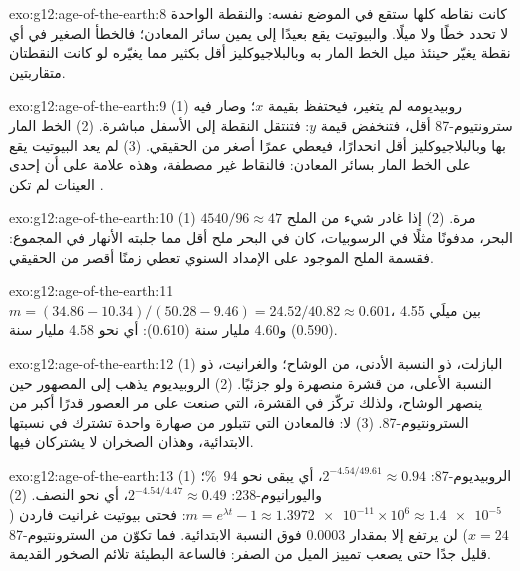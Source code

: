 \begin{solution}{exo:g12:age-of-the-earth:8}
كانت نقاطه كلها ستقع في الموضع نفسه: والنقطة الواحدة لا تحدد خطًا ولا
ميلًا. والبيوتيت يقع بعيدًا إلى يمين سائر المعادن؛ فالخطأ الصغير في
أي نقطة يغيّر حينئذ ميل الخط المار به وبالبلاجيوكليز
أقل بكثير مما يغيّره لو كانت النقطتان متقاربتين.
\end{solution}

\begin{solution}{exo:g12:age-of-the-earth:9}
(1) روبيديومه لم يتغير، فيحتفظ بقيمة $x$؛ وصار فيه
سترونتيوم-87 أقل، فتنخفض قيمة $y$: فتنتقل النقطة إلى الأسفل مباشرة. (2) الخط
المار بها وبالبلاجيوكليز أقل انحدارًا، فيعطي عمرًا أصغر من الحقيقي.
(3) لم يعد البيوتيت يقع على الخط المار بسائر المعادن: فالنقاط
غير مصطفة، وهذه علامة على أن إحدى العينات لم تكن .
\end{solution}

\begin{solution}{exo:g12:age-of-the-earth:10}
(1) $4540/96 \approx 47$ مرة. (2) إذا غادر شيء من الملح البحر، مدفونًا
مثلًا في الرسوبيات، كان في البحر ملح أقل مما جلبته الأنهار في المجموع:
فقسمة الملح الموجود على الإمداد السنوي تعطي زمنًا أقصر من
الحقيقي.
\end{solution}

\begin{solution}{exo:g12:age-of-the-earth:11}
$m = (34.86 - 10.34)/(50.28 - 9.46) = 24.52/40.82 \approx 0.601$، بين
ميلَي 4.55 (0.590) و4.60 مليار سنة (0.610): أي نحو 4.58
مليار سنة.
\end{solution}

\begin{solution}{exo:g12:age-of-the-earth:12}
(1) البازلت، ذو النسبة الأدنى، من الوشاح؛ والغرانيت، ذو النسبة
الأعلى، من قشرة منصهرة ولو جزئيًا. (2) الروبيديوم يذهب إلى
المصهور حين ينصهر الوشاح، ولذلك تركّز في القشرة، التي
صنعت على مر العصور قدرًا أكبر من السترونتيوم-87. (3) لا: فالمعادن التي تتبلور
من صهارة واحدة تشترك في نسبتها الابتدائية، وهذان الصخران لا يشتركان فيها.
\end{solution}

\begin{solution}{exo:g12:age-of-the-earth:13}
(1) الروبيديوم-87: $2^{-4.54/49.61} \approx 0.94$، أي يبقى نحو \qty{94}{\percent}؛
واليورانيوم-238: $2^{-4.54/4.47} \approx 0.49$، أي نحو النصف. (2) $m =
e^{\lambda t} - 1 \approx \num{1.3972e-11} \times 10^6 \approx
\num{1.4e-5}$: فحتى بيوتيت غرانيت فاردن ($x = 24$) لن يرتفع
إلا بمقدار $0.0003$ فوق النسبة الابتدائية. فما تكوّن من السترونتيوم-87 قليل جدًا
حتى يصعب تمييز الميل من الصفر: فالساعة البطيئة تلائم الصخور القديمة.
\end{solution}

